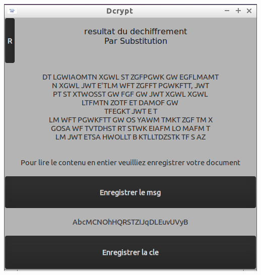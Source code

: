 \documentclass[a4]{article}
\begin{document}
			\begin{center}\includegraphics[scale=0.4]{12.png}\end{center}
\end{document}
